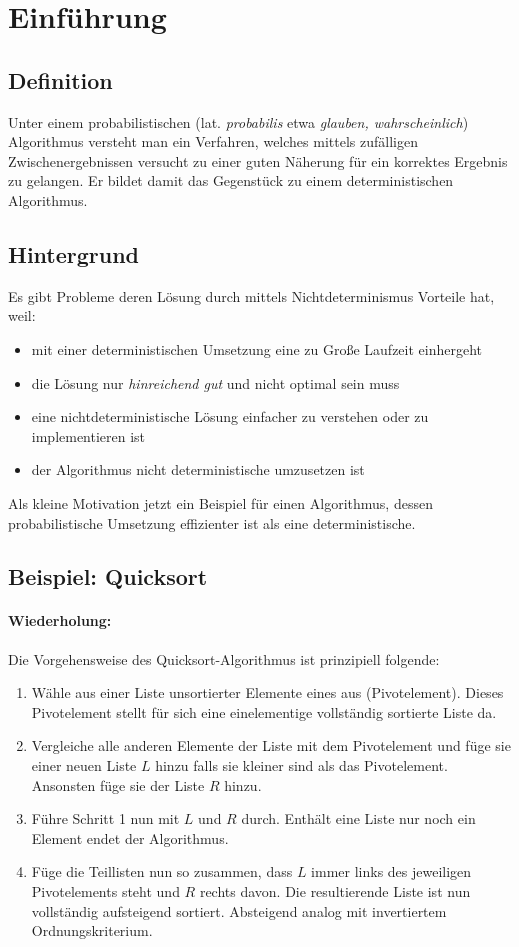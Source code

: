 \section{Einführung}


\subsection{Definition}
Unter einem probabilistischen (lat. \emph{probabilis} etwa \emph{glauben, wahrscheinlich}) Algorithmus versteht man ein Verfahren, welches mittels zufälligen Zwischenergebnissen versucht zu einer guten Näherung für ein korrektes Ergebnis zu gelangen.
Er bildet damit das Gegenstück zu einem deterministischen Algorithmus.
\cite{hopcroft_ullman}
\cite{sipser}

\subsection{Hintergrund}	
Es gibt Probleme deren Lösung durch mittels Nichtdeterminismus Vorteile hat, weil:
\begin{itemize}
	\item mit einer deterministischen Umsetzung eine zu Große Laufzeit einhergeht
	\item die Lösung nur \emph{hinreichend gut} und nicht optimal sein muss
	\item eine nichtdeterministische Lösung einfacher zu verstehen oder zu implementieren ist
	\item der Algorithmus nicht deterministische umzusetzen ist
\end{itemize}

Als kleine Motivation jetzt ein Beispiel für einen Algorithmus, dessen probabilistische Umsetzung effizienter ist als eine deterministische. 

\subsection{Beispiel: Quicksort}
\paragraph{Wiederholung:}
Die Vorgehensweise des Quicksort-Algorithmus ist prinzipiell folgende:
\begin{enumerate}
	\item Wähle aus einer Liste unsortierter Elemente eines aus (Pivotelement). Dieses Pivotelement stellt für sich eine einelementige vollständig sortierte Liste da.
	\item Vergleiche alle anderen Elemente der Liste mit dem Pivotelement und füge sie einer neuen Liste $L$ hinzu falls sie kleiner sind als das Pivotelement. Ansonsten füge sie der Liste $R$ hinzu.
	\item Führe Schritt 1 nun mit $L$ und $R$ durch. Enthält eine Liste nur noch ein Element endet der Algorithmus.
	\item Füge die Teillisten nun so zusammen, dass $L$ immer links des jeweiligen Pivotelements steht und $R$ rechts davon. Die resultierende Liste ist nun vollständig aufsteigend sortiert. Absteigend analog mit invertiertem Ordnungskriterium. 
\end{enumerate}


